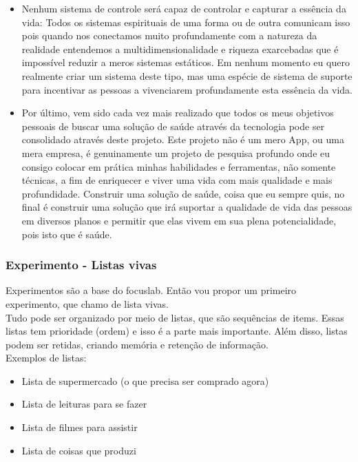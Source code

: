 \documentclass[11pt]{article}
\begin{document}
\begin{itemize}
\item Nenhum sistema de controle será capaz de controlar e capturar a essência da vida: Todos os sistemas espirituais de uma forma ou de outra comunicam isso pois quando nos conectamos muito profundamente com a natureza da realidade entendemos a multidimensionalidade e riqueza exarcebadas que é impossível reduzir a meros sistemas estáticos. Em nenhum momento eu quero realmente criar um sistema deste tipo, mas uma espécie de sistema de suporte para incentivar as pessoas a vivenciarem profundamente esta essência da vida.

\item Por último, vem sido cada vez mais realizado que todos os meus objetivos pessoais de buscar uma solução de saúde através da tecnologia pode ser consolidado através deste projeto. Este projeto não é um mero App, ou uma mera empresa, é genuinamente um projeto de pesquisa profundo onde eu consigo colocar em prática minhas habilidades e ferramentas, não somente técnicas, a fim de enriquecer e viver uma vida com mais qualidade e mais profundidade. Construir uma solução de saúde, coisa que eu sempre quis, no final é construir uma solução que irá suportar a qualidade de vida das pessoas em diversos planos e permitir que elas vivem em sua plena potencialidade, pois isto que é saúde.

\end{itemize}

\subsubsection{Experimento - Listas vivas}

Experimentos são a base do focuslab. Então vou propor um primeiro experimento, que chamo de lista vivas. \\

Tudo pode ser organizado por meio de listas, que são sequências de items. Essas listas tem prioridade (ordem) e isso é a parte mais importante. Além disso, listas podem ser retidas, criando memória e retenção de informação.\\

Exemplos de listas:\\

\begin{itemize}
    \item Lista de supermercado (o que precisa ser comprado agora)
    \item Lista de leituras para se fazer
    \item Lista de filmes para assistir
    \item Lista de coisas que produzi
\end{itemize}
\end{document}
